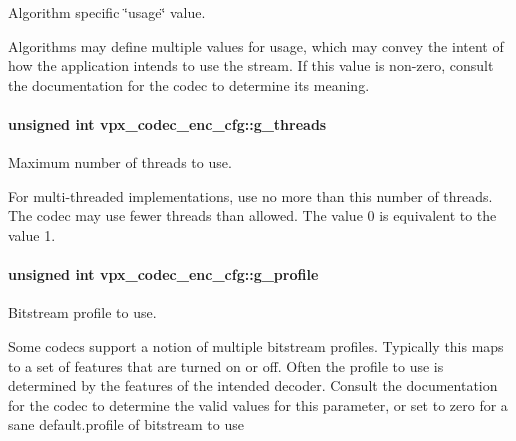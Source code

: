 Algorithm specific \char`\"{}usage\char`\"{} value. 

Algorithms may define multiple values for usage, which may convey the intent of how the application intends to use the stream. If this value is non-\/zero, consult the documentation for the codec to determine its meaning. 
\paragraph[{\texorpdfstring{g\+\_\+threads}{g_threads}}]{\setlength{\rightskip}{0pt plus 5cm}unsigned int vpx\+\_\+codec\+\_\+enc\+\_\+cfg\+::g\+\_\+threads}\hypertarget{structvpx__codec__enc__cfg_aff9d8d458c45c95dd542603210ba2b8b}{}\label{structvpx__codec__enc__cfg_aff9d8d458c45c95dd542603210ba2b8b}


Maximum number of threads to use. 

For multi-\/threaded implementations, use no more than this number of threads. The codec may use fewer threads than allowed. The value 0 is equivalent to the value 1. 
\paragraph[{\texorpdfstring{g\+\_\+profile}{g_profile}}]{\setlength{\rightskip}{0pt plus 5cm}unsigned int vpx\+\_\+codec\+\_\+enc\+\_\+cfg\+::g\+\_\+profile}\hypertarget{structvpx__codec__enc__cfg_a3d7fe3a8b237338c094d5a956a41804d}{}\label{structvpx__codec__enc__cfg_a3d7fe3a8b237338c094d5a956a41804d}


Bitstream profile to use. 

Some codecs support a notion of multiple bitstream profiles. Typically this maps to a set of features that are turned on or off. Often the profile to use is determined by the features of the intended decoder. Consult the documentation for the codec to determine the valid values for this parameter, or set to zero for a sane default.\+profile of bitstream to use 
